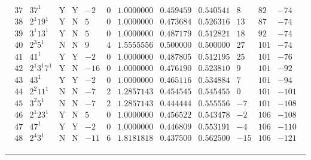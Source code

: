 \documentclass[11pt,reqno,a4letter]{article}
\numberwithin{figure}{section}
\numberwithin{table}{section}
\theoremstyle{plain}
\numberwithin{theorem}{section}
\theoremstyle{definition}
\begin{document}
\begin{table}[h!]
\begin{equation*}
{\begin{array}{cc|cc|ccc|cc|ccc}
 37 & 37^1 & \text{Y} & \text{Y} & -2 & 0 & 1.0000000 & 0.459459 & 0.540541 & 8 & 82 & -74 \\
 38 & 2^1 19^1 & \text{Y} & \text{N} & 5 & 0 & 1.0000000 & 0.473684 & 0.526316 & 13 & 87 & -74 \\
 39 & 3^1 13^1 & \text{Y} & \text{N} & 5 & 0 & 1.0000000 & 0.487179 & 0.512821 & 18 & 92 & -74 \\
 40 & 2^3 5^1 & \text{N} & \text{N} & 9 & 4 & 1.5555556 & 0.500000 & 0.500000 & 27 & 101 & -74 \\
 41 & 41^1 & \text{Y} & \text{Y} & -2 & 0 & 1.0000000 & 0.487805 & 0.512195 & 25 & 101 & -76 \\
 42 & 2^1 3^1 7^1 & \text{Y} & \text{N} & -16 & 0 & 1.0000000 & 0.476190 & 0.523810 & 9 & 101 & -92 \\
 43 & 43^1 & \text{Y} & \text{Y} & -2 & 0 & 1.0000000 & 0.465116 & 0.534884 & 7 & 101 & -94 \\
 44 & 2^2 11^1 & \text{N} & \text{N} & -7 & 2 & 1.2857143 & 0.454545 & 0.545455 & 0 & 101 & -101 \\
 45 & 3^2 5^1 & \text{N} & \text{N} & -7 & 2 & 1.2857143 & 0.444444 & 0.555556 & -7 & 101 & -108 \\
 46 & 2^1 23^1 & \text{Y} & \text{N} & 5 & 0 & 1.0000000 & 0.456522 & 0.543478 & -2 & 106 & -108 \\
 47 & 47^1 & \text{Y} & \text{Y} & -2 & 0 & 1.0000000 & 0.446809 & 0.553191 & -4 & 106 & -110 \\
 48 & 2^4 3^1 & \text{N} & \text{N} & -11 & 6 & 1.8181818 & 0.437500 & 0.562500 & -15 & 106 & -121 \\ 
\end{array}
}
\end{equation*}

\bigskip\hrule\smallskip 


\end{table}
\end{document}
